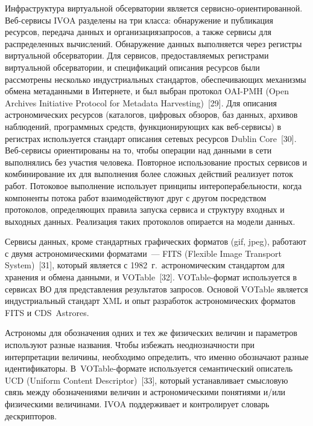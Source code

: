\begin{multicols}{2}
      Инфраструктура виртуальной обсерватории является 
сер\-вис\-но-ориен\-ти\-ро\-ван\-ной. Веб-сер\-ви\-сы IVOA разделены на три класса: 
обнаружение и пуб\-ликация ресурсов, передача данных и организация\linebreak запросов, а также 
сервисы для распределенных вычислений. Обнаружение данных выполняется через регистры 
виртуальной обсерватории. Для сервисов, предоставляемых регистрами виртуальной 
обсерватории, и спецификаций описания ресурсов были рассмотрены несколько 
индустриальных стандартов, обеспечивающих механизмы обмена метаданными в Интернете, 
и был выбран протокол OAI-PMH ({Open Archives Initiative Protocol for 
Metadata Harvesting})~[29]. Для описания астрономических ресурсов (каталогов, цифровых 
обзоров, баз данных, архивов наблюдений, программных средств, функционирующих как 
      веб-сер\-ви\-сы) в регистрах используется стандарт описания сетевых ресурсов 
Dublin Core~[30]. Веб-сер\-ви\-сы ориентированы на то, чтобы операции над данными в сети 
выполнялись без участия человека. Повторное использование простых сервисов и 
комбинирование их для выполнения более сложных действий реализует поток работ. 
Потоковое выполнение использует принципы интероперабельности, когда компоненты 
потока работ взаимодействуют друг с другом посредством протоколов, опре\-де\-ля\-ющих 
правила запуска сервиса и структуру входных и выходных данных. Реализация таких 
протоколов опирается на модели данных. 
      
      Сервисы данных, кроме стандартных графических форматов (gif, jpeg), работают 
с двумя астрономическими форматами~--- FITS ({Flexible Image Transport 
System})~[31], который является с 1982~г.\ астрономическим стандартом для хранения и 
обмена данными, и VOTable~[32]. VOTable-фор\-мат используется в сервисах ВО для 
представления результатов запросов. Основой VOTable является индустриальный стандарт 
XML и опыт разработок астрономических форматов FITS и CDS\ Astrores. 
      
      Астрономы для обозначения одних и тех же физических величин и параметров 
используют \mbox{разные} названия. Чтобы избежать не\-од\-но\-знач\-ности при интерпретации 
величины, необходимо определить, что именно обозначают разные идентификаторы. 
В~VOTable-фор\-ма\-те используется семантический описатель UCD ({Uniform 
Content Descriptor})~[33], который устанавливает смысловую связь между обозначениями 
величин и астрономическими понятиями и/или физическими величинами. IVOA 
поддерживает и контролирует словарь дескрипторов. 
      

\end{multicols}
